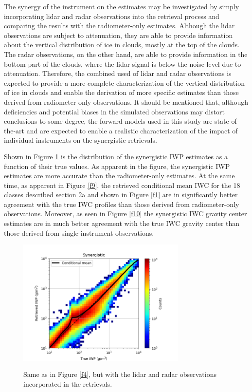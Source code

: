 \documentclass{ametsocV6.1}
\begin{document}
The synergy of the instrument on the estimates may be investigated by simply incorporating lidar 
and radar observations
into the retrieval process and comparing the results with the radiometer-only estimates.  Although
the lidar observations are subject to attenuation, they are able to provide information about the vertical
distribution of ice in clouds, mostly at the top of the clouds. The radar observations, on the other hand,
are able to provide information in the bottom part of the clouds, where the lidar signal is below the noise
level due to attenuation. Therefore, the combined used of lidar and radar observations is expected to 
provide a more complete characterization of the vertical distribution of ice in clouds and enable the
derivation of more specific estimates than those derived from radiometer-only observations. It should be mentioned that, 
although deficiencies 
and potential biases in the simulated observations may distort conclusions to some degree, the forward models
used in this study are state-of-the-art and are expected to enable a realistic characterization of the impact
of individual instruments on the synergistic retrievals.

Shown in Figure \ref{f8} is the distribution of the synergistic IWP estimates as a function of their true
values.  As apparent in the figure, the synergistic IWP estimates are more accurate than the radiometer-only
estimates. At the same time, as apparent in Figure \ref{f9}, the retrieved conditional mean IWC for the 
18 classes described section 2a and shown in Figure \ref{f1} are in significantly better
agreement with the true IWC profiles than those derived from radiometer-only observations.  Moreover,
as seen in Figure \ref{f10} the synergistic IWC gravity center estimates are in much better agreement with 
the true IWC gravity center than those derived from single-instrument observations.

\begin{figure}[t]
    \centering
    \includegraphics[width=0.75\textwidth,angle=0]{fig08.rev.png}\\
    \caption{Same as in Figure \ref{f4}, but with the lidar and radar observations incorporated in the
    retrievals.}\label{f8}
\end{figure}
\end{document}
